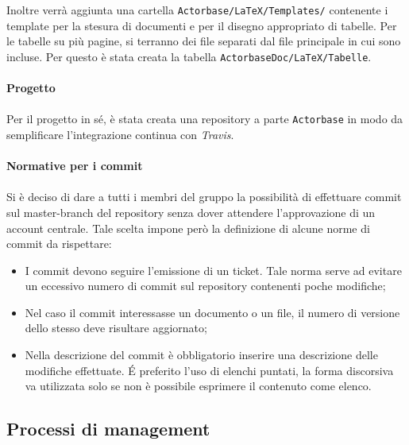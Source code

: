 \documentclass[a4paper]{article}
\begin{document}
	Inoltre verrà aggiunta una cartella \verb|Actorbase/LaTeX/Templates/| contenente i template per la stesura di documenti e per il
	disegno appropriato di tabelle. 
    Per le tabelle su più pagine, si terranno dei file separati dal file principale in cui sono incluse. Per questo è stata creata la tabella 
    \verb|ActorbaseDoc/LaTeX/Tabelle|.
    \\ \\
	\textbf{Progetto} \\ \\
    Per il progetto in sé, è stata creata una repository a parte \verb|Actorbase| in modo da semplificare l'integrazione continua con \emph{Travis}.
	\\ \\
    \textbf{Normative per i commit} \\ \\
		Si è deciso di dare a tutti i membri del gruppo la possibilità di effettuare commit sul master-branch del repository
		senza dover attendere l'approvazione di un account centrale. Tale scelta impone però la definizione di alcune norme
		di commit da rispettare:
		\begin{itemize}
			\item I commit devono seguire l'emissione di un ticket. Tale norma serve ad evitare un eccessivo numero di
			 commit sul repository contenenti poche modifiche;
			\item Nel caso il commit interessasse un documento o un file, il numero di versione dello stesso deve risultare
			 aggiornato;
			\item Nella descrizione del commit è obbligatorio inserire una descrizione delle modifiche effettuate. \'E preferito
			l'uso di elenchi puntati, la forma discorsiva va utilizzata solo se non è possibile esprimere il contenuto come
			elenco.
		\end{itemize}
	\subsection{Processi di management}
\end{document}
